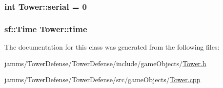 \hypertarget{class_tower_a53001ebc47ba7e60fdb7eb1dcdd82a64}{
\subsubsection[{serial}]{\setlength{\rightskip}{0pt plus 5cm}int Tower\+::serial = 0\hspace{0.3cm}{\ttfamily [static]}}}\label{class_tower_a53001ebc47ba7e60fdb7eb1dcdd82a64}
\hypertarget{class_tower_a2536099ae99cd22eef6d84259dab5ed7}{
\subsubsection[{time}]{\setlength{\rightskip}{0pt plus 5cm}sf\+::\+Time Tower\+::time\hspace{0.3cm}{\ttfamily [protected]}}}\label{class_tower_a2536099ae99cd22eef6d84259dab5ed7}


The documentation for this class was generated from the following files\+:\begin{DoxyCompactItemize}
\item 
jamms/\+Tower\+Defense/\+Tower\+Defense/include/game\+Objects/\hyperlink{_tower_8h}{Tower.\+h}\item 
jamms/\+Tower\+Defense/\+Tower\+Defense/src/game\+Objects/\hyperlink{_tower_8cpp}{Tower.\+cpp}\end{DoxyCompactItemize}
